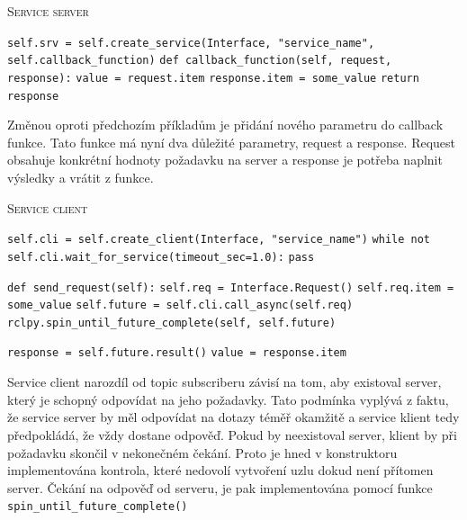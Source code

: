 \begin{algorithm}[h!]
	\label{}
	\caption{\textsc{Service server}}
	
	\DontPrintSemicolon
	\SetAlgoNoLine
	\SetNlSty{}{}{:}
	\SetNlSkip{-1.1em}
	
	\BlankLine \Indp\Indpp
	
	\texttt{self.srv = self.create\_service(Interface, "service\_name", self.callback\_function)}\;
	\BlankLine
	\texttt{def callback\_function(self, request, response):}\;
	\Indp\Indp
	\texttt{value = request.item}\;
	\texttt{response.item = some\_value}\;
	\texttt{return response}\;
	
\end{algorithm}
Změnou oproti předchozím příkladům je přidání nového parametru do callback funkce. Tato funkce má nyní dva důležité parametry, request a response. Request obsahuje konkrétní hodnoty požadavku na server a response je potřeba naplnit výsledky a vrátit z funkce. \cite{ros2_documentation}

\begin{algorithm}[h!]
	\label{}
	\caption{\textsc{Service client}}
	
	\DontPrintSemicolon
	\SetAlgoNoLine
	\SetAlgoNlRelativeSize{-1}
	\SetNlSty{}{}{:}
	\SetNlSkip{-1.1em}
	
	\BlankLine \Indp\Indpp
	
	\texttt{self.cli = self.create\_client(Interface, "service\_name")}\;
	\texttt{while not self.cli.wait\_for\_service(timeout\_sec=1.0):}\;
	\Indp\Indp
	\texttt{pass}\;
	\Indm\Indm

	\BlankLine
	\texttt{def send\_request(self):}\;
	\Indp\Indp
	\texttt{self.req = Interface.Request()}\;
	\texttt{self.req.item = some\_value}\;
	\texttt{self.future = self.cli.call\_async(self.req)}\;
	\texttt{rclpy.spin\_until\_future\_complete(self, self.future)}\;
	
	\BlankLine
	\texttt{response = self.future.result()}\;
	\texttt{value = response.item}\;
\end{algorithm}
Service client narozdíl od topic subscriberu závisí na tom, aby existoval server, který je schopný odpovídat na jeho požadavky. Tato podmínka vyplývá z faktu, že service server by měl odpovídat na dotazy téměř okamžitě a service klient tedy předpokládá, že vždy dostane odpověď. Pokud by neexistoval server, klient by při požadavku skončil v nekonečném čekání. Proto je hned v konstruktoru implementována kontrola, které nedovolí vytvoření uzlu dokud není přítomen server. Čekání na odpověď od serveru, je pak implementována pomocí funkce \verb|spin_until_future_complete()| \cite{ros2_documentation}


